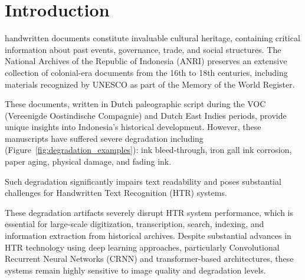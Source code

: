 \documentclass[journal]{IEEEtran}
\begin{document}
\section{Introduction}
 handwritten documents constitute invaluable cultural heritage, containing critical information about past events, governance, trade, and social structures. The National Archives of the Republic of Indonesia (ANRI) preserves an extensive collection of colonial-era documents from the 16th to 18th centuries, including materials recognized by UNESCO as part of the Memory of the World Register.

These documents, written in Dutch paleographic script during the VOC (Vereenigde Oostindische Compagnie) and Dutch East Indies periods, provide unique insights into Indonesia's historical development. However, these manuscripts have suffered severe degradation including (Figure~\ref{fig:degradation_examples}): ink bleed-through, iron gall ink corrosion, paper aging, physical damage, and fading ink.

Such degradation significantly impairs text readability and poses substantial challenges for Handwritten Text Recognition (HTR) systems.

These degradation artifacts severely disrupt HTR system performance, which is essential for large-scale digitization, transcription, search, indexing, and information extraction from historical archives. Despite substantial advances in HTR technology using deep learning approaches, particularly Convolutional Recurrent Neural Networks (CRNN) and transformer-based architectures, these systems remain highly sensitive to image quality and degradation levels.

\end{document}
